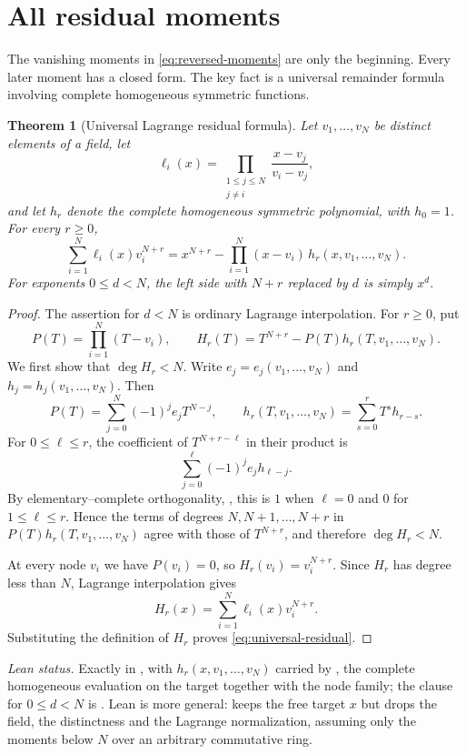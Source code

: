 \documentclass[11pt,a4paper,oneside,openany]{book}
\newtheorem{theorem}{Theorem}[chapter]
\theoremstyle{definition}
\theoremstyle{remark}
\begin{document}
\section{All residual moments}

The vanishing moments in \eqref{eq:reversed-moments} are only the beginning.  Every later moment has a closed form.  The key fact is a universal remainder formula involving complete homogeneous symmetric functions.

\begin{theorem}[Universal Lagrange residual formula]\label{thm:universal-lagrange-residual}
Let $v_1,\ldots,v_N$ be distinct elements of a field, let
\[
 \ell_i(x)=\prod_{\substack{1\le j\le N\\j\ne i}}
 \frac{x-v_j}{v_i-v_j},
\]
and let $h_r$ denote the complete homogeneous symmetric polynomial, with $h_0=1$.  For every $r\ge0$,
\begin{equation}\label{eq:universal-residual}
 \sum_{i=1}^{N}\ell_i(x)v_i^{N+r}
 =x^{N+r}-\prod_{i=1}^{N}(x-v_i)\,
 h_r(x,v_1,\ldots,v_N).
\end{equation}
For exponents $0\le d<N$, the left side with $N+r$ replaced by $d$ is simply $x^d$.
\end{theorem}

\begin{proof}
The assertion for $d<N$ is ordinary Lagrange interpolation.  For $r\ge0$, put
\[
 P(T)=\prod_{i=1}^{N}(T-v_i),
 \qquad
 H_r(T)=T^{N+r}-P(T)h_r(T,v_1,\ldots,v_N).
\]
We first show that $\deg H_r<N$.  Write $e_j=e_j(v_1,\ldots,v_N)$ and
$h_j=h_j(v_1,\ldots,v_N)$.  Then
\[
 P(T)=\sum_{j=0}^{N}(-1)^je_jT^{N-j},
 \qquad
 h_r(T,v_1,\ldots,v_N)=\sum_{s=0}^{r}T^s h_{r-s}.
\]
For $0\le \ell\le r$, the coefficient of $T^{N+r-\ell}$ in their product is
\[
 \sum_{j=0}^{\ell}(-1)^je_jh_{\ell-j}.
\]
By elementary--complete orthogonality, , this is $1$ when $\ell=0$ and $0$ for $1\le\ell\le r$.  Hence the terms of degrees $N,N+1,\ldots,N+r$ in $P(T)h_r(T,v_1,\ldots,v_N)$ agree with those of $T^{N+r}$, and therefore $\deg H_r<N$.

At every node $v_i$ we have $P(v_i)=0$, so
$H_r(v_i)=v_i^{N+r}$.  Since $H_r$ has degree less than $N$, Lagrange interpolation gives
\[
 H_r(x)=\sum_{i=1}^{N}\ell_i(x)v_i^{N+r}.
\]
Substituting the definition of $H_r$ proves \eqref{eq:universal-residual}.
\end{proof}
\emph{Lean status.}  Exactly  in
, with \(h_r(x,v_1,\ldots,v_N)\) carried by
, the complete homogeneous evaluation on the target together
with the node family; the clause for \(0\le d<N\) is .
Lean is more general:  keeps the free target \(x\) but drops
the field, the distinctness and the Lagrange normalization, assuming only the moments below \(N\)
over an arbitrary commutative ring.
\end{document}
